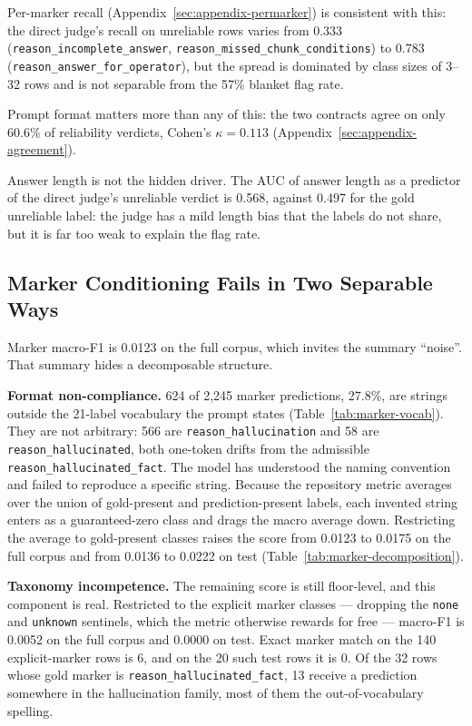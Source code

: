 \documentclass{zapiski}
\begin{document}
Per-marker recall (Appendix~\ref{sec:appendix-permarker}) is consistent with
this: the direct judge's recall on unreliable rows varies from 0.333
(\texttt{reason\_incomplete\_answer},
\texttt{reason\_missed\_chunk\_conditions}) to 0.783
(\texttt{reason\_answer\_for\_operator}), but the spread is dominated by class
sizes of 3--32 rows and is not separable from the 57\% blanket flag rate.

Prompt format matters more than any of this: the two contracts agree on only
60.6\% of reliability verdicts, Cohen's $\kappa = 0.113$
(Appendix~\ref{sec:appendix-agreement}).

Answer length is not the hidden driver. The AUC of answer length as a
predictor of the direct judge's unreliable verdict is 0.568, against 0.497 for
the gold unreliable label: the judge has a mild length bias that the labels
do not share, but it is far too weak to explain the flag rate.

\subsection{Marker Conditioning Fails in Two Separable Ways}
\label{sec:results-markers}

Marker macro-F1 is 0.0123 on the full corpus, which invites the summary
``noise''. That summary hides a decomposable structure.

\textbf{Format non-compliance.} 624 of 2,245 marker predictions, 27.8\%, are
strings outside the 21-label vocabulary the prompt states
(Table~\ref{tab:marker-vocab}). They are not
arbitrary: 566 are \texttt{reason\_hallucination} and 58 are
\texttt{reason\_hallucinated}, both one-token drifts from the admissible
\texttt{reason\_hallucinated\_fact}. The model has understood the naming
convention and failed to reproduce a specific string. Because the repository
metric averages over the union of gold-present and prediction-present labels,
each invented string enters as a guaranteed-zero class and drags the macro
average down. Restricting the average to gold-present classes raises the score
from 0.0123 to 0.0175 on the full corpus and from 0.0136 to 0.0222 on test
(Table~\ref{tab:marker-decomposition}).

\textbf{Taxonomy incompetence.} The remaining score is still floor-level, and
this component is real. Restricted to the explicit marker classes --- dropping
the \texttt{none} and \texttt{unknown} sentinels, which the metric otherwise
rewards for free --- macro-F1 is 0.0052 on the full corpus and 0.0000 on test.
Exact marker match on the 140 explicit-marker rows is 6, and on the 20 such
test rows it is 0. Of the 32 rows whose gold marker is
\texttt{reason\_hallucinated\_fact}, 13 receive a prediction somewhere in the
hallucination family, most of them the out-of-vocabulary spelling.
\end{document}
